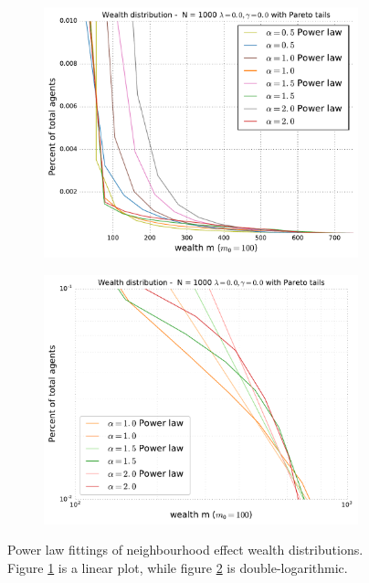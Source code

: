 \documentclass[10pt, a4paper]{amsart}
\begin{document}
\begin{figure}
\begin{subfigure}{.49\textwidth}
	\centering
	\includegraphics[width=\linewidth]{../figures/5d/5d_0-var-0-PARETO.pdf}
	\caption{}
	\label{fig:neighbourpareto1}
\end{subfigure}
\begin{subfigure}{.49\textwidth}
	\centering
	\includegraphics[width=\linewidth]{../figures/5d/5d_0-var-0-POWERLOG.pdf}
	\caption{}
	\label{fig:neighourpareto2}
\end{subfigure}
\caption{Power law fittings of neighbourhood effect wealth distributions. Figure \ref{fig:neighbourpareto1} is a linear plot, while figure \ref{fig:neighourpareto2} is double-logarithmic.}
\label{fig:neighbourpareto}
\end{figure}
\end{document}
